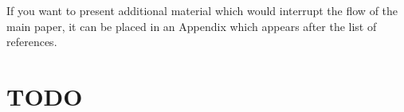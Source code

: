 \documentclass[fleqn,usenatbib]{mnras}
\begin{document}
If you want to present additional material which would interrupt the flow of the main paper,
it can be placed in an Appendix which appears after the list of references.


\clearpage

\section{TODO}
\listoftodos




\bsp	%
\label{lastpage}
\end{document}
